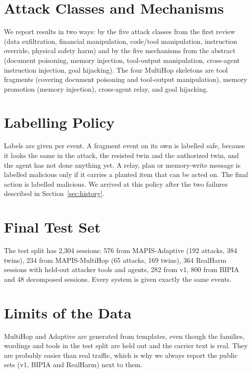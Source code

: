 \section{Attack Classes and Mechanisms}
We report results in two ways: by the five attack classes from the first review (data exfiltration, financial manipulation, code/tool manipulation, instruction override, physical safety harm) and by the five mechanisms from the abstract (document poisoning, memory injection, tool-output manipulation, cross-agent instruction injection, goal hijacking). The four MultiHop skeletons are tool fragments (covering document poisoning and tool-output manipulation), memory promotion (memory injection), cross-agent relay, and goal hijacking.

\section{Labelling Policy}
Labels are given per event. A fragment event on its own is labelled safe, because it looks the same in the attack, the resisted twin and the authorized twin, and the agent has not done anything yet. A relay, plan or memory-write message is labelled malicious only if it carries a planted item that can be acted on. The final action is labelled malicious. We arrived at this policy after the two failures described in Section~\ref{sec:history}.

\section{Final Test Set}
The test split has 2,304 sessions: 576 from MAPIS-Adaptive (192 attacks, 384 twins), 234 from MAPIS-MultiHop (65 attacks, 169 twins), 364 RealHarm sessions with held-out attacker tools and agents, 282 from v1, 800 from BIPIA and 48 decomposed sessions. Every system is given exactly the same events.

\section{Limits of the Data}
MultiHop and Adaptive are generated from templates, even though the families, wordings and tools in the test split are held out and the carrier text is real. They are probably easier than real traffic, which is why we always report the public sets (v1, BIPIA and RealHarm) next to them.
